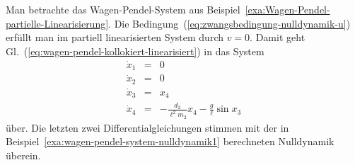 \begin{example}
\label{exa:wagen-pendel-system-nulldynamik2}Man betrachte das Wagen-Pendel-System
aus Beispiel~\ref{exa:Wagen-Pendel-partielle-Linearisierung}. Die
Bedingung~(\ref{eq:zwangsbedingung-nulldynamik-u}) erfüllt man im
partiell linearisierten System durch $v=0$. Damit geht Gl.~(\ref{eq:wagen-pendel-kollokiert-linearisiert})
in das System 
\begin{equation}
\begin{array}{lcl}
\dot{x}_{1} & = & 0\\
\dot{x}_{2} & = & 0\\
\dot{x}_{3} & = & x_{4}\\
\dot{x}_{4} & = & -\frac{d_{2}}{\ell^{2}m_{2}}x_{4}-\frac{g}{\ell}\sin x_{3}
\end{array}\label{eq:wagen-pendel-nulldynamik2}
\end{equation}
über. Die letzten zwei Differentialgleichungen stimmen mit der in
Beispiel~\ref{exa:wagen-pendel-system-nulldynamik1} berechneten
Nulldynamik überein.
\end{example}

